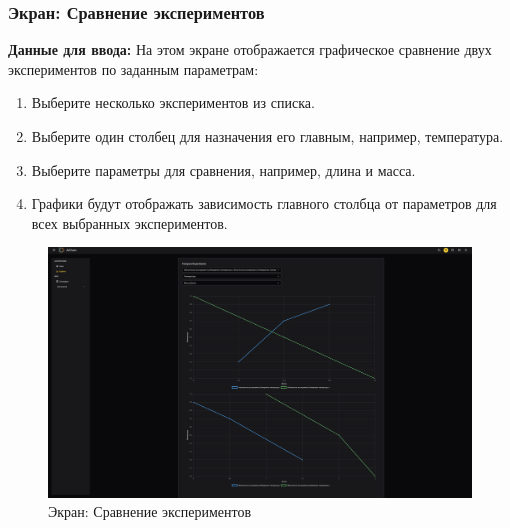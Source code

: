 \documentclass[a4paper,12pt,reqno]{article}
\begin{document}
\subsubsection{Экран: Сравнение экспериментов}
\textbf{Данные для ввода:}  
На этом экране отображается графическое сравнение двух экспериментов по заданным параметрам:
\begin{enumerate}
    \item Выберите несколько экспериментов из списка.
    \item Выберите один столбец для назначения его главным, например, температура.
    \item Выберите параметры для сравнения, например, длина и масса.
    \item Графики будут отображать зависимость главного столбца от параметров для всех выбранных экспериментов.
\end{enumerate}
\begin{figure}[H]
    \centering
    \includegraphics[width=\textwidth]{RO/img/multiple_doc.png} %
    \caption{Экран: Сравнение экспериментов}
    \label{fig:comp_exp}
\end{figure}
\end{document}
